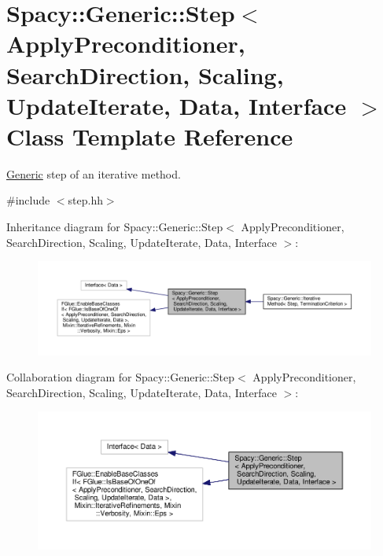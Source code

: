 \hypertarget{classSpacy_1_1Generic_1_1Step}{\section{Spacy\-:\-:Generic\-:\-:Step$<$ Apply\-Preconditioner, Search\-Direction, Scaling, Update\-Iterate, Data, Interface $>$ Class Template Reference}
\label{classSpacy_1_1Generic_1_1Step}
}


\hyperlink{namespaceSpacy_1_1Generic}{Generic} step of an iterative method.  




{\ttfamily \#include $<$step.\-hh$>$}



Inheritance diagram for Spacy\-:\-:Generic\-:\-:Step$<$ Apply\-Preconditioner, Search\-Direction, Scaling, Update\-Iterate, Data, Interface $>$\-:
\nopagebreak
\begin{figure}[H]
\begin{center}
\leavevmode
\includegraphics[width=350pt]{classSpacy_1_1Generic_1_1Step__inherit__graph}
\end{center}
\end{figure}


Collaboration diagram for Spacy\-:\-:Generic\-:\-:Step$<$ Apply\-Preconditioner, Search\-Direction, Scaling, Update\-Iterate, Data, Interface $>$\-:
\nopagebreak
\begin{figure}[H]
\begin{center}
\leavevmode
\includegraphics[width=350pt]{classSpacy_1_1Generic_1_1Step__coll__graph}
\end{center}
\end{figure}
